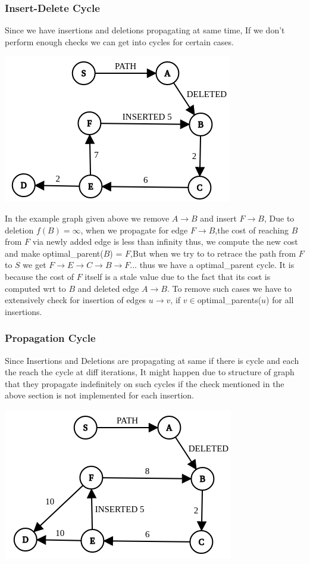 \documentclass[a4paper]{article}
\begin{document}
\subsubsection{Insert-Delete Cycle}
Since we have insertions and deletions propagating at same time, If we don't perform enough checks we can get into cycles for certain cases. 
\begin{center}
\includegraphics[scale=0.45]{img/ins_del_cycle.png}        
\end{center}
In the example graph given above we remove $A \rightarrow B$ and insert $F \rightarrow B$, Due to deletion $f(B) = \infty$, when we propagate for edge $F \rightarrow B$,the cost of reaching $B$ from $F$ via newly added edge is less than infinity thus, we compute the new cost and make optimal\_parent($B$) = $F$,But when we try to to retrace the path from $F$ to $S$ we get $F\rightarrow E\rightarrow C\rightarrow B\rightarrow F...$ thus we have a optimal\_parent cycle. It is because the cost of $F$ itself is a stale value due to the fact that its cost is computed wrt to $B$ and deleted edge $A \rightarrow B$. To remove such cases we have to extensively check for insertion of edges $u \rightarrow v$, if $v \in $optimal\_parents($u$) for all insertions.\\

\subsubsection{Propagation Cycle}
Since Insertions and Deletions are propagating at same if there is cycle and each the reach the cycle at diff iterations, It might happen due to structure of graph that they propagate indefinitely on such cycles if the check mentioned in the above section is not implemented for each insertion.  

\begin{center}
\includegraphics[scale=0.45]{img/prop_cycle.png}        
\end{center}
\end{document}

